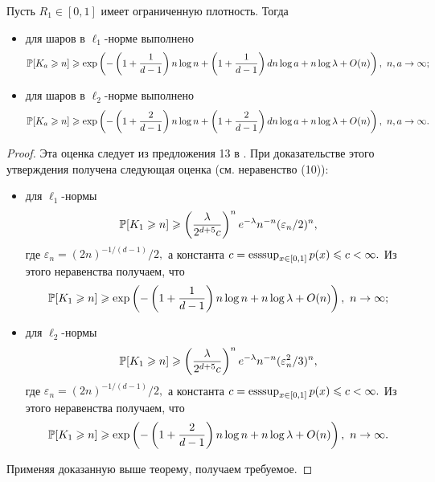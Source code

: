 \begin{cor}
Пусть $R_1\in [0, 1]$ имеет ограниченную плотность. Тогда 
\begin{itemize}
    \item для шаров в $\ell_1$-норме выполнено
    $$\mathbb{P}[K_a \geqslant n] \geqslant \exp \left(-\left(1+\dfrac{1}{d-1}\right)n\log n + \left(1+\dfrac{1}{d-1}\right)dn\log a  +n\log\lambda + O(n)\right),\  n, a\to \infty;$$
    \item для шаров в $\ell_2$-норме выполнено
    $$\mathbb{P}[K_a \geqslant n] \geqslant \exp \left(-\left(1+\dfrac{2}{d-1}\right)n\log n + \left(1+\dfrac{2}{d-1}\right)dn\log a  +n\log\lambda + O(n)\right),\  n, a\to \infty.$$
\end{itemize}
\end{cor}

\begin{proof}
Эта оценка следует из предложения 13 в \cite{AL}. При доказательстве этого утверждения получена следующая оценка (см. неравенство (10)):
\begin{itemize}
    \item для $\ell_1$-нормы 
    $$\mathbb{P}[K_1\geqslant n] \geqslant \left(\dfrac{\lambda}{2^{d+5}c}\right)^ne^{-\lambda}n^{-n}(\varepsilon_n/2)^n,$$ где $\varepsilon_n = (2n)^{-1/(d-1)}/2,$ а константа $c = \operatorname{esssup}_{x\in[0,1]} p(x) \leqslant c < \infty.$ Из этого неравенства получаем, что
    $$\mathbb{P}[K_1 \geqslant n] \geqslant \exp \left(-\left(1+\dfrac{1}{d-1}\right)n\log n + n\log\lambda + O(n)\right),\  n\to \infty;$$
    \item для $\ell_2$-нормы  $$\mathbb{P}[K_1\geqslant n] \geqslant \left(\dfrac{\lambda}{2^{d+5}c}\right)^ne^{-\lambda}n^{-n}(\varepsilon_n^2/3)^n,$$ где $\varepsilon_n = (2n)^{-1/(d-1)}/2,$ а константа $c = \operatorname{esssup}_{x\in[0,1]} p(x) \leqslant c < \infty.$ Из этого неравенства получаем, что
    $$\mathbb{P}[K_1 \geqslant n] \geqslant \exp \left(-\left(1+\dfrac{2}{d-1}\right)n\log n +  n\log\lambda + O(n)\right),\  n\to \infty.$$
\end{itemize}
Применяя доказанную выше теорему, получаем требуемое.
\end{proof}


